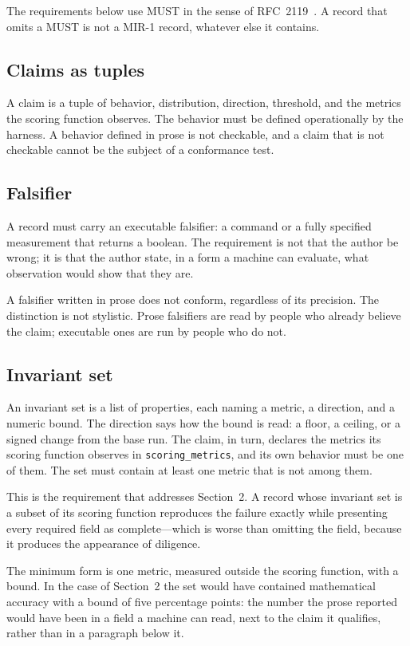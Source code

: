 \documentclass[11pt]{article}
\begin{document}
The requirements below use MUST in the sense of RFC~2119~\cite{rfc2119}. A
record that omits a MUST is not a MIR-1 record, whatever else it contains.

\subsection{Claims as tuples}

A claim is a tuple of behavior, distribution, direction, threshold, and the
metrics the scoring function observes. The
behavior must be defined operationally by the harness. A behavior defined in
prose is not checkable, and a claim that is not checkable cannot be the subject
of a conformance test.

\subsection{Falsifier}

A record must carry an executable falsifier: a command or a fully specified
measurement that returns a boolean. The requirement is not that the author be
wrong; it is that the author state, in a form a machine can evaluate, what
observation would show that they are.

A falsifier written in prose does not conform, regardless of its precision. The
distinction is not stylistic. Prose falsifiers are read by people who already
believe the claim; executable ones are run by people who do not.

\subsection{Invariant set}

An invariant set is a list of properties, each naming a metric, a direction, and
a numeric bound. The direction says how the bound is read: a floor, a ceiling,
or a signed change from the base run. The claim, in turn, declares the metrics
its scoring function observes in \texttt{scoring\_metrics}, and its own behavior
must be one of them. The set must contain at least one metric that is not among
them.

This is the requirement that addresses Section~2. A record whose invariant set
is a subset of its scoring function reproduces the failure exactly while
presenting every required field as complete---which is worse than omitting the
field, because it produces the appearance of diligence.

The minimum form is one metric, measured outside the scoring function, with a
bound. In the case of Section~2 the set would have contained mathematical
accuracy with a bound of five percentage points: the number the prose reported
would have been in a field a machine can read, next to the claim it qualifies,
rather than in a paragraph below it.
\end{document}
